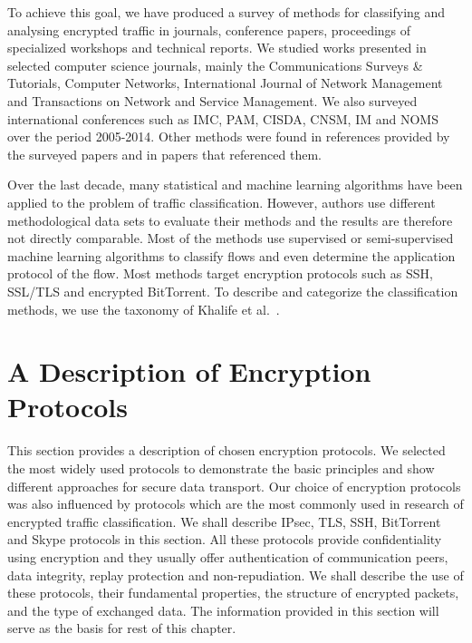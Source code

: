 To achieve this goal, we have produced a survey of methods for classifying and analysing encrypted traffic in journals, conference papers, proceedings of specialized workshops and technical reports. We studied works presented in selected computer science journals, mainly the Communications Surveys \& Tutorials, Computer Networks, International Journal of Network Management and Transactions on Network and Service Management. We also surveyed international conferences such as IMC, PAM, CISDA, CNSM, IM and NOMS over the period 2005-2014. Other methods were found in references provided by the surveyed papers and in papers that referenced them.

Over the last decade, many statistical and machine learning algorithms have been applied to the problem of traffic classification. However, authors use different methodological data sets to evaluate their methods and the results are therefore not directly comparable. Most of the methods use supervised or semi-supervised machine learning algorithms to classify flows and even determine the application protocol of the flow. Most methods target encryption protocols such as SSH, SSL/TLS and encrypted BitTorrent. To describe and categorize the classification methods, we use the taxonomy of Khalife et al.~\cite{Khalife-2014-multilevel}. 




\section{A Description of Encryption Protocols} \label{sec:traffic-description}

This section provides a description of chosen encryption protocols. We selected the most widely used protocols to demonstrate the basic principles and show different approaches for secure data transport. Our choice of encryption protocols was also influenced by protocols which are the most commonly used in research of encrypted traffic classification. We shall describe IPsec, TLS, SSH, BitTorrent and Skype protocols in this section. All these protocols provide confidentiality using encryption and they usually offer authentication of communication peers, data integrity, replay protection and non-repudiation. We shall describe the use of these protocols, their fundamental properties, the structure of encrypted packets, and the type of exchanged data. The information provided in this section will serve as the basis for rest of this chapter.

